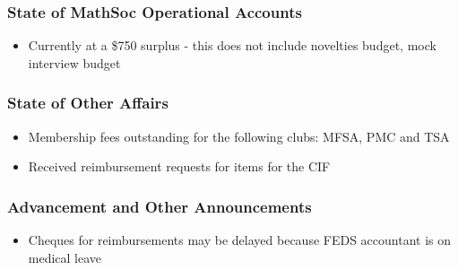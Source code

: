 \subsubsection*{State of MathSoc Operational Accounts}
\begin{itemize}
\item Currently at a \$750 surplus - this does not include novelties budget, mock interview budget 
\end{itemize}

\subsubsection*{State of Other Affairs}
\begin{itemize}
\item Membership fees outstanding for the following clubs: MFSA, PMC and TSA
\item Received reimbursement requests for items for the CIF
\end{itemize}

\subsubsection*{Advancement and Other Announcements}
\begin{itemize}
\item Cheques for reimbursements may be delayed because FEDS accountant is on medical leave
\end{itemize}